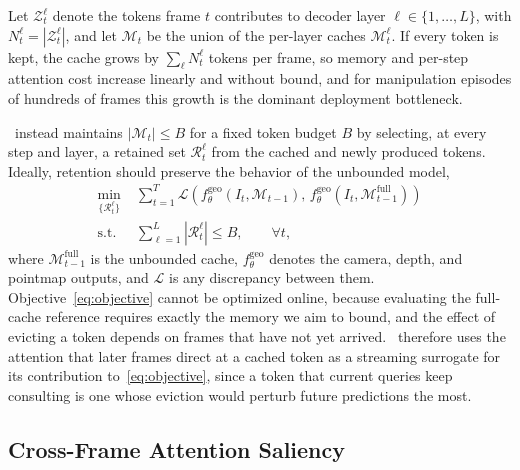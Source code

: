 Let $\mathcal{Z}_t^{\ell}$ denote the tokens frame $t$ contributes to decoder layer $\ell\in\{1,\dots,L\}$, with $N_t^{\ell}=|\mathcal{Z}_t^{\ell}|$, and let $\mathcal{M}_t$ be the union of the per-layer caches $\mathcal{M}_t^{\ell}$. If every token is kept, the cache grows by $\sum_{\ell} N_t^{\ell}$ tokens per frame, so memory and per-step attention cost increase linearly and without bound, and for manipulation episodes of hundreds of frames this growth is the dominant deployment bottleneck.

\method\ instead maintains $|\mathcal{M}_t|\le B$ for a fixed token budget $B$ by selecting, at every step and layer, a retained set $\mathcal{R}_t^{\ell}$ from the cached and newly produced tokens. Ideally, retention should preserve the behavior of the unbounded model,
\begin{equation}
\begin{aligned}
\min_{\{\mathcal{R}_t^{\ell}\}}\;
& \sum_{t=1}^{T}
\mathcal{L}\!\left(
f^{\mathrm{geo}}_{\theta}(I_t, \mathcal{M}_{t-1}),\,
f^{\mathrm{geo}}_{\theta}(I_t, \mathcal{M}^{\mathrm{full}}_{t-1})
\right) \\
\text{s.t.}\;
& \sum\nolimits_{\ell=1}^{L} |\mathcal{R}_t^{\ell}| \le B,
\qquad \forall t,
\end{aligned}
\label{eq:objective}
\end{equation}
where $\mathcal{M}^{\mathrm{full}}_{t-1}$ is the unbounded cache, $f^{\mathrm{geo}}_{\theta}$ denotes the camera, depth, and pointmap outputs, and $\mathcal{L}$ is any discrepancy between them. Objective~\eqref{eq:objective} cannot be optimized online, because evaluating the full-cache reference requires exactly the memory we aim to bound, and the effect of evicting a token depends on frames that have not yet arrived. \method\ therefore uses the attention that later frames direct at a cached token as a streaming surrogate for its contribution to~\eqref{eq:objective}, since a token that current queries keep consulting is one whose eviction would perturb future predictions the most.

\subsection{Cross-Frame Attention Saliency}
\label{sec:cfas}

